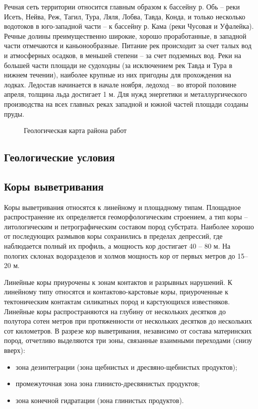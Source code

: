 Речная сеть территории относится главным образом к бассейну р. Обь – реки Исеть, Нейва, Реж, Тагил, Тура, Ляля, Лобва, Тавда, Конда, и только несколько водотоков в юго-западной части – к бассейну р. Кама (реки Чусовая и Уфалейка). Речные долины преимущественно широкие, хорошо проработанные, в западной части отмечаются и каньонообразные. Питание рек происходит за счет талых вод и атмосферных осадков, в меньшей степени – за счет подземных вод. Реки на большей части площади не судоходны (за исключением рек Тавда и Тура в нижнем течении), наиболее крупные из них пригодны для прохождения на лодках. Ледостав начинается в начале ноября, ледоход – во второй половине апреля, толщина льда достигает 1 м. Для нужд энергетики и металлургического производства на всех
главных реках западной и южной частей площади созданы пруды.

\begin{figure}[h]
	\caption{Геологическая карта района работ}
\end{figure}

\subsection*{Геологические условия}
\txtGeology

\subsection*{Коры выветривания}
Коры выветривания относятся к линейному и площадному типам. Площадное распространение их определяется геоморфологическим строением, а тип коры – литологическим и петрографическим составом пород субстрата. Наиболее хорошо от последующих размывов коры сохранились в пределах депрессий, где наблюдается полный их профиль, а  мощность кор достигает 40 – 80 м. На пологих склонах водоразделов и холмов мощность кор от первых метров до 15–20 м.

Линейные коры приурочены к зонам контактов и разрывных нарушений. К линейному типу относятся и контактово-карстовые коры, приуроченные к тектоническим контактам силикатных пород и карстующихся
известняков. Линейные коры распространяются на глубину от нескольких десятков до полутора сотен метров при протяженности от нескольких десятков до нескольких сот километров. В разрезе кор выветривания, независимо от состава материнских пород, отчетливо выделяются три зоны, связанные взаимными переходами (снизу вверх): 
\begin{itemize}
\item зона дезинтеграции (зона щебнистых и дресвяно-щебнистых продуктов);
\item промежуточная зона зона глинисто-дресвянистых продуктов;
\item зона конечной гидратации (зона глинистых продуктов).
\end{itemize}


